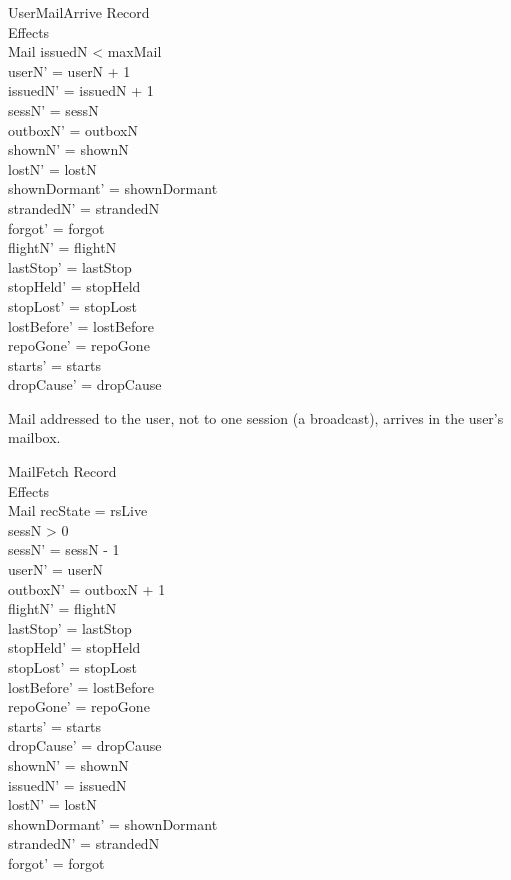 \documentclass[a4paper,10pt,fleqn]{article}
\begin{document}
\begin{schema}{UserMailArrive}
  \Xi Record \\
  \Xi Effects \\
  \Delta Mail
  \where
  issuedN < maxMail \\
  userN' = userN + 1 \\
  issuedN' = issuedN + 1 \\
  sessN' = sessN \\
  outboxN' = outboxN \\
  shownN' = shownN \\
  lostN' = lostN \\
  shownDormant' = shownDormant \\
  strandedN' = strandedN \\
  forgot' = forgot \\
  flightN' = flightN \\
  lastStop' = lastStop \\
  stopHeld' = stopHeld \\
  stopLost' = stopLost \\
  lostBefore' = lostBefore \\
  repoGone' = repoGone \\
  starts' = starts \\
  dropCause' = dropCause
\end{schema}

Mail addressed to the user, not to one session (a broadcast), arrives in the user's
mailbox.

\begin{schema}{MailFetch}
  \Xi Record \\
  \Xi Effects \\
  \Delta Mail
  \where
  recState = rsLive \\
  sessN > 0 \\
  sessN' = sessN - 1 \\
  userN' = userN \\
  outboxN' = outboxN + 1 \\
  flightN' = flightN \\
  lastStop' = lastStop \\
  stopHeld' = stopHeld \\
  stopLost' = stopLost \\
  lostBefore' = lostBefore \\
  repoGone' = repoGone \\
  starts' = starts \\
  dropCause' = dropCause \\
  shownN' = shownN \\
  issuedN' = issuedN \\
  lostN' = lostN \\
  shownDormant' = shownDormant \\
  strandedN' = strandedN \\
  forgot' = forgot
\end{schema}
\end{document}
